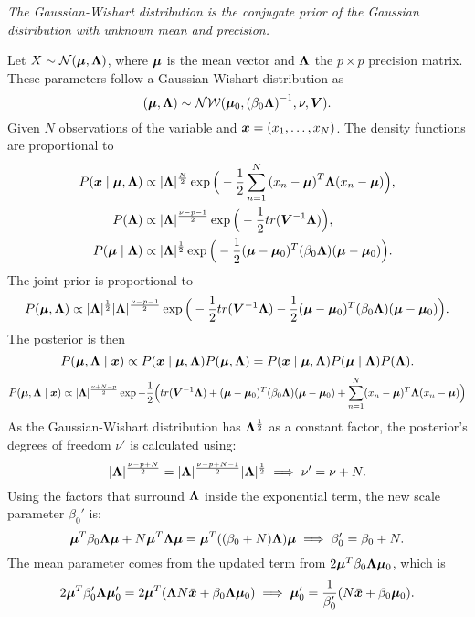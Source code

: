 \emph{The Gaussian-Wishart distribution is the conjugate prior of the Gaussian distribution with unknown mean and precision.}


Let \(X \sim \mathcal{N}(\bm{\mu}, \bm{\Lambda})\), where \(\bm{\mu}\) is the mean vector and \(\bm{\Lambda}\) the \(p \times p\)  precision matrix. These parameters follow a Gaussian-Wishart distribution as
\[
  (\bm{\mu}, \bm{\Lambda}) \sim \mathcal{N}\mathcal{W}(\bm{\mu}_{0}, {(\beta_{0}\bm{\Lambda})}^{-1}, \nu, \bm{V}).
\]
Given \(N\) observations of the variable and \(\bm{x} =(x_{1},\dots, x_{N})\). The density functions are proportional to
\[
  \begin{aligned}
    P(\bm{x} \mid \bm{\mu}, \bm{\Lambda}) &\propto |\bm{\Lambda}|^{\frac{N}{2}}\exp \Big( -\frac{1}{2}\sum_{n=1}^{N}{(x_{n} - \bm{\mu})}^{T}\bm{\Lambda}(x_{n} - \bm{\mu}) \Big),\\
    P(\bm{\Lambda}) &\propto |\bm{\Lambda}|^{\frac{\nu-p-1}{2}}\exp \Big(-\frac{1}{2}tr(\bm{V}^{-1}\bm{\Lambda})\Big),\\
    P(\bm{\mu} \mid \bm{\Lambda}) &\propto |\bm{\Lambda}|^{\frac{1}{2}} \exp \Big( -\frac{1}{2}(\bm{\mu} - \bm{\mu}_{0})^{T}(\beta_{0}\bm{\Lambda})(\bm{\mu}-\bm{\mu}_{0}) \Big).
  \end{aligned}
\]
The joint prior is proportional to
\[
  P(\bm{\mu}, \bm{\Lambda}) \propto |\bm{\Lambda}|^{\frac{1}{2}}|\bm{\Lambda}|^{\frac{\nu-p-1}{2}}\exp \Big(-\frac{1}{2}tr(\bm{V}^{-1}\bm{\Lambda}) -\frac{1}{2}(\bm{\mu} - \bm{\mu}_{0})^{T}(\beta_{0}\bm{\Lambda})(\bm{\mu}-\bm{\mu}_{0}) \Big).
\]
The posterior is then
\[
  P(\bm{\mu}, \bm{\Lambda} \mid \bm{x}) \propto P(\bm{x} \mid \bm{\mu}, \bm{\Lambda})P(\bm{\mu}, \bm{\Lambda}) = P(\bm{x} \mid \bm{\mu}, \bm{\Lambda})P(\bm{\mu} \mid \bm{\Lambda}) P(\bm{\Lambda}).
\]
\[
  P(\bm{\mu}, \bm{\Lambda} \mid \bm{x}) \propto |\bm{\Lambda}|^{\frac{\nu + N - p}{2}} \exp -\frac{1}{2}\Big( tr(\bm{V}^{-1}\bm{\Lambda}) + (\bm{\mu} - \bm{\mu}_{0})^{T} (\beta_{0}\bm{\Lambda})(\bm{\mu} - \bm{\mu}_{0}) + \sum_{n=1}^{N}(x_{n} - \bm{\mu})^{T}\bm{\Lambda}(x_{n}- \bm{\mu})  \Big)
\]
As the Gaussian-Wishart distribution has \(\bm{\Lambda}^{\frac{1}{2}}\) as a constant factor, the posterior's degrees of freedom \(\nu'\) is calculated using:
\[
  |\bm{\Lambda}|^{\frac{\nu - p + N}{2}} = |\bm{\Lambda}|^{\frac{\nu - p + N-1}{2}} |\bm{\Lambda}|^{\frac{1}{2}}  \implies \nu' = \nu + N.
\]
Using the factors that surround \(\bm{\Lambda}\) inside the exponential term, the new scale parameter \(\beta_{0}'\) is:
\[
  \bm{\mu}^{T}\beta_{0}\bm{\Lambda}\bm{\mu} + N\bm{\mu}^{T}\bm{\Lambda}\bm{\mu} = \bm{\mu}^{T}((\beta_{0} + N)\bm{\Lambda})\bm{\mu} \implies \beta_{0}' = \beta_{0} + N.
\]
The mean parameter comes from the updated term from \(2\bm{\mu}^{T}\beta_{0}\bm{\Lambda}\bm{\mu}_{0}\), which is
\[
  2\bm{\mu}^{T}\beta_{0}'\bm{\Lambda}\bm{\mu}_{0}' = 2\bm{\mu}^{T}(\bm{\Lambda} N \bar{\bm{x}} + \beta_{0}\bm{\Lambda}\bm{\mu}_{0}) \implies \bm{\mu}_{0}' = \frac{1}{\beta_{0}'}(N\bar{\bm{x}} + \beta_{0}\bm{\mu}_{0}).
\]
